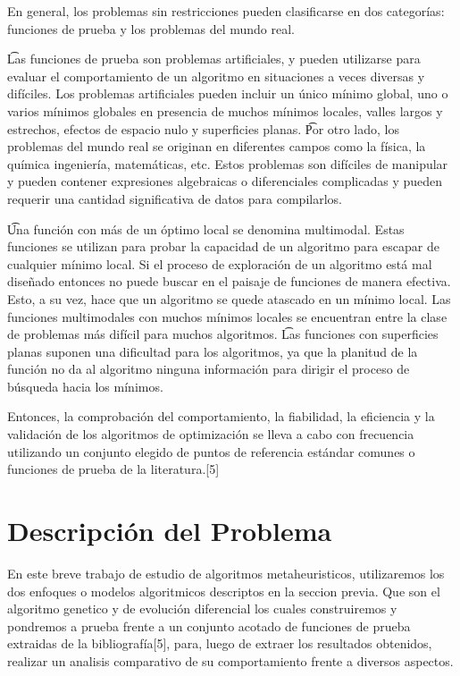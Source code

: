 \documentclass[10pt]{article}
\begin{document}
En general, los problemas sin restricciones pueden clasificarse en dos categorías: funciones de prueba y los problemas del mundo real.\newline

\t Las funciones de prueba son problemas artificiales, y pueden utilizarse para evaluar el comportamiento de un algoritmo en situaciones a veces diversas y difíciles. Los problemas artificiales pueden incluir un único mínimo global, uno o varios mínimos globales en presencia de muchos mínimos locales, valles largos y estrechos, efectos de espacio nulo y superficies planas. 
\t Por otro lado, los problemas del mundo real se originan en diferentes campos como la física, la química ingeniería, matemáticas, etc. Estos problemas son difíciles de manipular y pueden contener expresiones algebraicas o diferenciales complicadas y pueden requerir una cantidad significativa de datos para compilarlos.

\t Una función con más de un óptimo local se denomina multimodal. Estas funciones se utilizan para probar la capacidad de un algoritmo para escapar de cualquier mínimo local. Si el proceso de exploración de un algoritmo está mal diseñado entonces no puede buscar en el paisaje de funciones de manera efectiva. Esto, a su vez, hace que un algoritmo se quede atascado en un mínimo local. Las funciones multimodales con muchos mínimos locales se encuentran entre la clase de problemas más difícil para muchos algoritmos. 
\t Las funciones con superficies planas suponen una dificultad para los algoritmos, ya que la planitud de la función no da al algoritmo ninguna información para dirigir el proceso de búsqueda hacia los mínimos.\newline

Entonces, la comprobación del comportamiento, la fiabilidad, la eficiencia y la validación de los algoritmos de optimización se lleva a cabo con frecuencia utilizando un conjunto elegido de puntos de referencia estándar comunes o funciones de prueba de la literatura.[5]

\section{Descripción del Problema}

En este breve trabajo de estudio de algoritmos metaheuristicos, utilizaremos los dos enfoques o modelos algoritmicos descriptos en la seccion previa. Que son el algoritmo genetico y de evolución diferencial los cuales construiremos y pondremos a prueba frente a un conjunto acotado de funciones de prueba extraidas de la bibliografía[5], para, luego de extraer los resultados obtenidos, realizar un analisis comparativo de su comportamiento frente a diversos aspectos.
\end{document}
